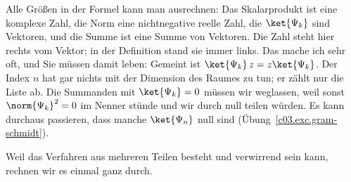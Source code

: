 Alle Größen in der Formel kann man ausrechnen: Das Skalarprodukt ist eine komplexe Zahl, die
Norm eine nichtnegative reelle Zahl, die $\ket{\Psi_k}$ sind Vektoren, und die Summe ist eine Summe von Vektoren. Die Zahl
steht hier rechts vom Vektor; in der Definition stand sie immer links. Das mache ich sehr oft,
und Sie müssen damit leben: Gemeint ist $\ket{\Psi_k}\, z = z \ket{\Psi_k}$. Der Index $n$ hat
gar nichts mit der Dimension des Raumes zu tun; er zählt nur die Liste ab. Die Summanden mit
$\ket{\Psi_k} = 0$ müssen wir weglassen, weil sonst $\norm{\Psi_k}^2 = 0$ im Nenner stünde und
wir durch null teilen würden. Es kann durchaus passieren, dass manche $\ket{\Psi_n}$ null sind
(Übung~\ref{c03.exc.gram-schmidt}).

Weil das Verfahren aus mehreren Teilen besteht und verwirrend sein kann, rechnen wir es einmal
ganz durch.

